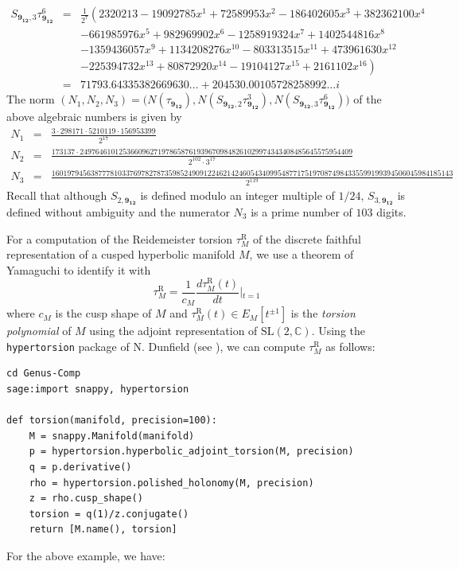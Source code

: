 \documentclass[12pt]{amsart}
\newcommand{\Reid}{\mathrm{R}}
\theoremstyle{definition}
\def\BC{\mathbb C}
\def\SL{\mathrm{SL}}
\newcommand{\mb}{\mathbf}
\numberwithin{equation}{section}
\begin{document}
\begin{eqnarray*}
S_{\mb{9_{12}},3}\tau_{\mb{9_{12}}}^6&=& 
\frac{1}{2^7}
\left(2320213 -19092785 x^{1} + 72589953 x^{2} -186402605 x^{3} 
+ 382362100 x^{4} 
\right. \\ 
& & \left.
-661985976 x^{5} + 982969902 x^{6} -1258919324 x^{7} 
+ 1402544816 x^{8} 
\right. \\ 
& & \left.
-1359436057 x^{9} + 1134208276 x^{10} -803313515 x^{11} 
+ 473961630 x^{12} 
\right. \\ 
& & \left.
-225394732 x^{13} + 80872920 x^{14} -19104127 x^{15} 
+ 2161102 x^{16}
\right)
\\
&=& 71793.64335382669630\dots + 204530.00105728258992\dots i
\end{eqnarray*}
The norm $(N_1,N_2,N_3)=\big(N(\tau_{\mb{9_{12}}}), N(S_{\mb{9_{12}},2}\tau_{\mb{9_{12}}}^3),
N(S_{\mb{9_{12}},3}\tau_{\mb{9_{12}}}^6)\big)$ 
of the above algebraic numbers is given by
{\tiny
\begin{eqnarray*}
N_1&=& \frac{3 \cdot 298171 \cdot 5210119 \cdot 156953399}{2^{17}}
\\
N_2&=& 
\frac{ 173137 \cdot 
2497646101253660962719786587619396709848261029974343408485645575954409}{
2^{102} \cdot 3^{17}}
\\
N_3&=&
\frac{1601979456387778103376978278735985249091224621424605434099548771751970874984335599199394506045984185143}{2^{119}}
\end{eqnarray*}
}
\noindent 
Recall that although $S_{2,\mb{9_{12}}}$ is defined modulo an integer multiple of 
$1/24$, $S_{3,\mb{9_{12}}}$ is defined without ambiguity 
and the numerator $N_3$ is a prime number of $103$ digits.

For a computation of the Reidemeister torsion $\tau^{\Reid}_M$ of the discrete 
faithful representation of a cusped hyperbolic manifold $M$,  
we use a theorem of Yamaguchi \cite{Ya} to identify it with
$$
\tau^\Reid_M=\frac{1}{c_M}\frac{d\tau^\Reid_M(t)}{dt}\left|_{t=1} \right.
$$ 
where $c_M$ is the cusp shape of $M$ and 
$\tau^\Reid_M(t) \in E_M[t^{\pm 1}]$ is the {\em torsion polynomial} of $M$ using the
adjoint representation of $\SL(2,\BC)$. 
Using the {\tt hypertorsion} package of N. Dunfield (see \cite{DFJ}), 
we can compute $\tau^\Reid_M$ as follows:

\begin{verbatim}
cd Genus-Comp
sage:import snappy, hypertorsion

def torsion(manifold, precision=100):
    M = snappy.Manifold(manifold)
    p = hypertorsion.hyperbolic_adjoint_torsion(M, precision)
    q = p.derivative()
    rho = hypertorsion.polished_holonomy(M, precision)
    z = rho.cusp_shape()
    torsion = q(1)/z.conjugate()
    return [M.name(), torsion]
\end{verbatim}
For the above example, we have:
\end{document}
